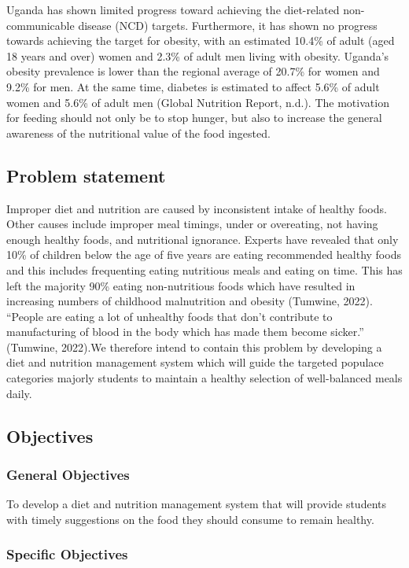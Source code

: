 \documentclass{article}
\begin{document}
Uganda has shown limited progress toward achieving the diet-related non-communicable disease (NCD) targets. Furthermore, it has shown no progress towards achieving the target for obesity, with an estimated 10.4\% of adult (aged 18 years and over) women and 2.3\% of adult men living with obesity. Uganda's obesity prevalence is lower than the regional average of 20.7\% for women and 9.2\% for men. At the same time, diabetes is estimated to affect 5.6\% of adult women and 5.6\% of adult men (Global Nutrition Report, n.d.). The motivation for feeding should not only be to stop hunger, but also to increase the general awareness of the nutritional value of the food ingested.

\subsection{Problem statement}
Improper diet and nutrition are caused by inconsistent intake of healthy foods. Other causes include improper meal timings, under or overeating, not having enough healthy foods, and nutritional ignorance. Experts have revealed that only 10\% of children below the age of five years are eating recommended healthy foods and this includes frequenting eating nutritious meals and eating on time. This has left the majority 90\% eating non-nutritious foods which have resulted in increasing numbers of childhood malnutrition and obesity (Tumwine, 2022). “People are eating a lot of unhealthy foods that don’t contribute to manufacturing of blood in the body which has made them become sicker.” (Tumwine, 2022).We therefore intend to contain this problem by developing a diet and nutrition management system which will guide the targeted populace categories majorly students to maintain a healthy selection of well-balanced meals daily.

\subsection{Objectives}
\subsubsection{General Objectives}

To develop a diet and nutrition management system that will provide students with timely suggestions on the food they should consume to remain healthy. 

\subsubsection{Specific Objectives}
\end{document}
